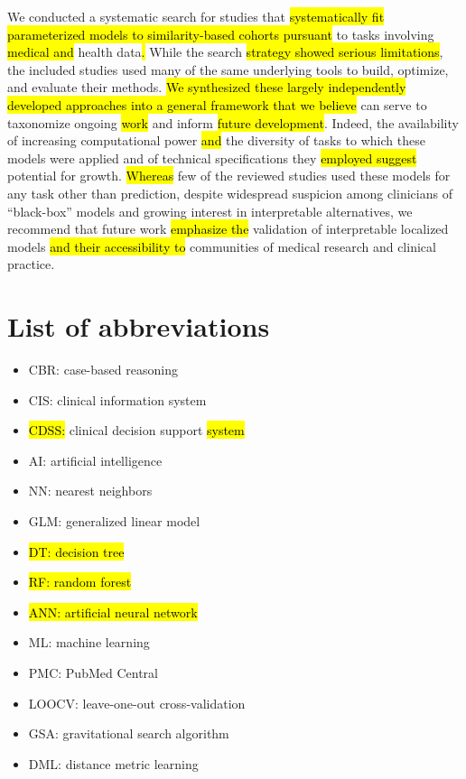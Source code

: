 \documentclass[sn-mathphys,Numbered,pdflatex]{sn-jnl}
\theoremstyle{remark}
\theoremstyle{definition}
\providecommand{\tightlist}{%
  \setlength{\itemsep}{0pt}\setlength{\parskip}{0pt}}
\begin{document}
We conducted a systematic search for studies that
\hl{systematically fit parameterized models to similarity-based cohorts pursuant}
to tasks involving \hl{medical and }health data\hl{. }While the search
\hl{strategy showed serious limitations}, the included studies used many
of the same underlying tools to build, optimize, and evaluate their
methods.
\hl{We synthesized these largely independently developed approaches into a general framework that we believe}
can serve to taxonomize ongoing \hl{work }and inform
\hl{future development}. Indeed, the availability of increasing
computational power\hl{ and} the diversity of tasks to which these
models were applied and of technical specifications they
\hl{employed suggest }potential for growth. \hl{Whereas} few of the
reviewed studies used these models for any task other than prediction,
despite widespread suspicion among clinicians of ``black-box'' models
and growing interest in interpretable alternatives, we recommend that
future work \hl{emphasize the} validation of interpretable localized
models \hl{and their accessibility to} communities of medical research
and clinical practice.

\section*{List of abbreviations}\label{list-of-abbreviations}

\begin{itemize}
\tightlist
\item
  CBR: case-based reasoning
\item
  CIS: clinical information system
\item
  \hl{CDSS:} clinical decision support\hl{ system}
\item
  AI: artificial intelligence
\item
  NN: nearest neighbors
\item
  GLM: generalized linear model
\item
  \hl{DT: decision tree}
\item
  \hl{RF: random forest}
\item
  \hl{ANN: artificial neural network}
\item
  ML: machine learning
\item
  PMC: PubMed Central
\item
  LOOCV: leave-one-out cross-validation
\item
  GSA: gravitational search algorithm
\item
  DML: distance metric learning
\end{itemize}
\end{document}
